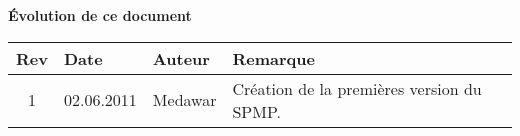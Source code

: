 \begin{large}
\textbf{Évolution de ce  document\\}
\end{large}
\begin{tabular}{|c|l|l|l|}
\hline  Rev &  Date &  Auteur & Remarque \\ 
\hline  1 &  02.06.2011 & Medawar  & Création de la premières version du SPMP. \\ 
\hline 
\end{tabular} 